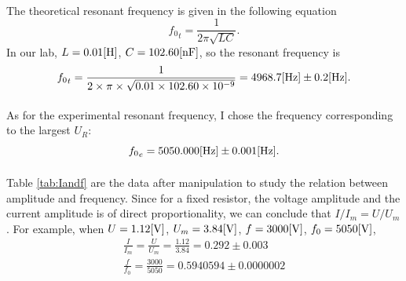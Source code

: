 \documentclass{my_template}
\begin{document}
    \paragraph{} The theoretical resonant frequency is given in the following equation$${f_0}_t=\frac{1}{2\pi\sqrt{LC}}.$$ In our lab, $L=0.01[\rm H]$, $C=102.60[\rm nF]$, so the resonant frequency is $${f_0}_t=\frac{1}{2\times\pi\times\sqrt{0.01\times 102.60\times 10^{-9}}}=4968.7[\rm Hz]\pm 0.2[Hz].$$
    \paragraph{} As for the experimental resonant frequency, I chose the frequency corresponding to the largest $U_R$: $${f_0}_e=5050.000[\rm Hz]\pm 0.001[Hz].$$
    \paragraph{} Table \ref{tab:Iandf} are the data after manipulation to study the relation between amplitude and frequency. Since for a fixed resistor, the voltage amplitude and the current amplitude is of direct proportionality, we can conclude that $I/I_m=U/U_m$. For example, when $U=1.12[\rm V]$, $U_m=3.84[\rm V]$, $f=3000[\rm V]$, $f_0=5050[\rm V]$, 
    \begin{equation*}
        \begin{split}
            \frac{I}{I_m}=\frac{U}{U_m}=\frac{1.12}{3.84}=0.292\pm 0.003\\
            \frac{f}{f_0}=\frac{3000}{5050}=0.5940594\pm 0.0000002\\
        \end{split}
    \end{equation*}
\end{document}
